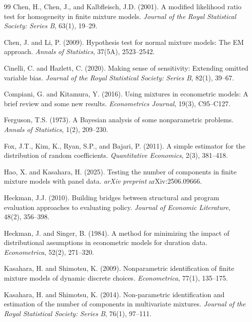 \documentclass[12pt]{article}
\begin{document}
\begin{thebibliography}{99}
Chen, H., Chen, J., and Kalbfleisch, J.D. (2001). A modified likelihood ratio test for homogeneity in finite mixture models. \textit{Journal of the Royal Statistical Society: Series B}, 63(1), 19--29.

Chen, J. and Li, P. (2009). Hypothesis test for normal mixture models: The EM approach. \textit{Annals of Statistics}, 37(5A), 2523--2542.

Cinelli, C. and Hazlett, C. (2020). Making sense of sensitivity: Extending omitted variable bias. \textit{Journal of the Royal Statistical Society: Series B}, 82(1), 39--67.

Compiani, G. and Kitamura, Y. (2016). Using mixtures in econometric models: A brief review and some new results. \textit{Econometrics Journal}, 19(3), C95--C127.

Ferguson, T.S. (1973). A Bayesian analysis of some nonparametric problems. \textit{Annals of Statistics}, 1(2), 209--230.

Fox, J.T., Kim, K., Ryan, S.P., and Bajari, P. (2011). A simple estimator for the distribution of random coefficients. \textit{Quantitative Economics}, 2(3), 381--418.

Hao, X. and Kasahara, H. (2025). Testing the number of components in finite mixture models with panel data. \textit{arXiv preprint} arXiv:2506.09666.

Heckman, J.J. (2010). Building bridges between structural and program evaluation approaches to evaluating policy. \textit{Journal of Economic Literature}, 48(2), 356--398.

Heckman, J. and Singer, B. (1984). A method for minimizing the impact of distributional assumptions in econometric models for duration data. \textit{Econometrica}, 52(2), 271--320.

Kasahara, H. and Shimotsu, K. (2009). Nonparametric identification of finite mixture models of dynamic discrete choices. \textit{Econometrica}, 77(1), 135--175.

Kasahara, H. and Shimotsu, K. (2014). Non-parametric identification and estimation of the number of components in multivariate mixtures. \textit{Journal of the Royal Statistical Society: Series B}, 76(1), 97--111.


\end{thebibliography}
\end{document}
